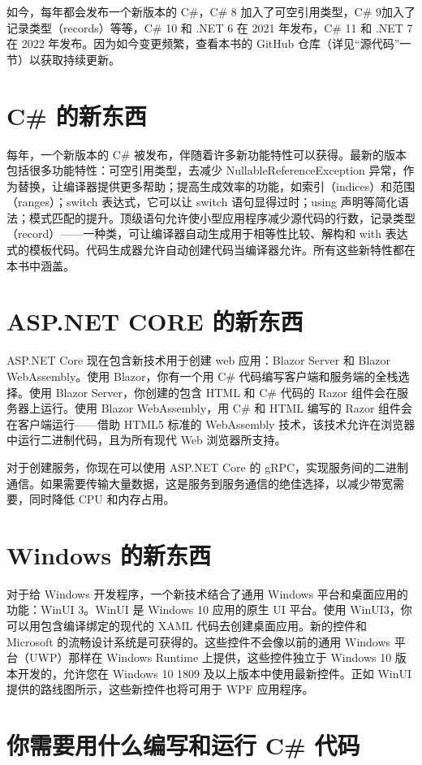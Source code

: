 如今，每年都会发布一个新版本的 C\#，C\# 8 加入了可空引用类型，C\# 9加入了记录类型（records）等等，C\# 10 和 .NET 6 在 2021 年发布，C\# 11 和 .NET 7 在 2022 年发布。因为如今变更频繁，查看本书的 GitHub 仓库（详见“源代码”一节）以获取持续更新。

\section*{C\# 的新东西}
每年，一个新版本的 C\# 被发布，伴随着许多新功能特性可以获得。最新的版本包括很多功能特性：可空引用类型，去减少 NullableReferenceException 异常，作为替换，让编译器提供更多帮助；提高生成效率的功能，如索引（indices）和范围（ranges）；switch 表达式，它可以让 switch 语句显得过时；using 声明等简化语法；模式匹配的提升。顶级语句允许使小型应用程序减少源代码的行数，记录类型（record）——一种类，可让编译器自动生成用于相等性比较、解构和 with 表达式的模板代码。代码生成器允许自动创建代码当编译器允许。所有这些新特性都在本书中涵盖。

\section*{ASP.NET CORE 的新东西}
ASP.NET Core 现在包含新技术用于创建 web 应用：Blazor Server 和 Blazor WebAssembly。使用 Blazor，你有一个用 C\# 代码编写客户端和服务端的全栈选择。使用 Blazor Server，你创建的包含 HTML 和 C\# 代码的 Razor 组件会在服务器上运行。使用 Blazor WebAssembly，用 C\# 和 HTML 编写的 Razor 组件会在客户端运行——借助 HTML5 标准的 WebAssembly 技术，该技术允许在浏览器中运行二进制代码，且为所有现代 Web 浏览器所支持。

对于创建服务，你现在可以使用 ASP.NET Core 的 gRPC，实现服务间的二进制通信。如果需要传输大量数据，这是服务到服务通信的绝佳选择，以减少带宽需要，同时降低 CPU 和内存占用。

\section*{Windows 的新东西}
对于给 Windows 开发程序，一个新技术结合了通用 Windows 平台和桌面应用的功能：WinUI 3。WinUI 是 Windows 10 应用的原生 UI 平台。使用 WinUI3，你可以用包含编译绑定的现代的 XAML 代码去创建桌面应用。新的控件和 Microsoft 的流畅设计系统是可获得的。这些控件不会像以前的通用 Windows 平台（UWP）那样在 Windows Runtime 上提供，这些控件独立于 Windows 10 版本开发的，允许您在 Windows 10 1809 及以上版本中使用最新控件。正如 WinUI 提供的路线图所示，这些新控件也将可用于 WPF 应用程序。

\section*{你需要用什么编写和运行 C\# 代码}

